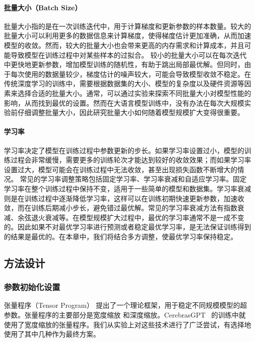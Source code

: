 \paragraph{批量大小（Batch Size）}
批量大小指的是在一次训练迭代中，用于计算梯度和更新参数的样本数量。较大的批量大小可以利用更多的数据信息来计算梯度，使得梯度估计更加准确，从而加速模型的收敛。然而，较大的批量大小也会带来更高的内存需求和计算成本，并且可能导致模型在训练过程中对某些样本的过拟合。
较小的批量大小可以在每次迭代中更快地更新参数，增加模型训练的随机性，有助于跳出局部最优解。但同时，由于每次使用的数据量较少，梯度估计的噪声较大，可能会导致模型收敛不稳定。在传统深度学习的训练中，需要根据数据集的大小、模型的复杂度以及硬件资源等因素来选择合适的批量大小。通常，可以通过实验来探索不同批量大小对模型性能的影响，从而找到最优的设置。然而在大语言模型训练中，没有办法在每次大规模实验前仔细调整批量大小，因此研究批量大小如何随着模型规模扩大变得很重要。

\paragraph{学习率}
学习率决定了模型在训练过程中参数更新的步长。如果学习率设置过小，模型的训练过程会非常缓慢，需要更多的训练轮次才能达到较好的收敛效果；而如果学习率设置过大，模型可能会在训练过程中无法收敛，甚至出现损失函数不断增大的情况。
常见的学习率调整策略包括固定学习率、学习率衰减和自适应学习率。固定学习率在整个训练过程中保持不变，适用于一些简单的模型和数据集。学习率衰减则是在训练过程中逐渐降低学习率，这样可以在训练初期快速更新参数，加速收敛，而在训练后期减小步长，避免错过最优解。常见的学习率衰减方法有指数衰减、余弦退火衰减等。在模型规模扩大过程中，最优的学习率通常不是一成不变的。因此如果不对最优学习率进行预测或者稳定最优学习率，是无法保证训练得到的结果是最优的。在本章中，我们将结合多方调整，使最优学习率保持稳定。


\subsection {方法设计}
\subsubsection {参数初始化设置}
张量程序（Tensor Program）\citep{yang2022tensor, yang2023tensor} 提出了一个理论框架，用于稳定不同规模模型的超参数。张量程序的主要部分是宽度缩放\citep{yang2022tensor} 和深度缩放\citep{yang2023tensor}。CerebrasGPT~\citep{dey2023cerebras} 的训练中就使用了宽度缩放的张量程序。我们从实验上对这些技术进行了广泛尝试，有选择地使用了其中几种作为最终方案。

